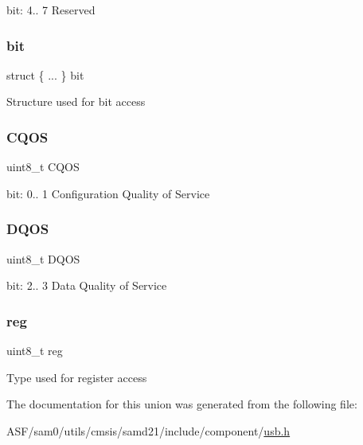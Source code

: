 bit\+: 4.. 7 Reserved \mbox{\label{union_u_s_b___q_o_s_c_t_r_l___type_a4f870df77aca85d5c6fe64a8fd95a56d}} 
\subsubsection{\texorpdfstring{bit}{bit}}
{\footnotesize\ttfamily struct \{ ... \}   bit}

Structure used for bit access \mbox{\label{union_u_s_b___q_o_s_c_t_r_l___type_a03cba86417c68f71d54469cf30dc94e4}} 
\subsubsection{\texorpdfstring{CQOS}{CQOS}}
{\footnotesize\ttfamily uint8\+\_\+t C\+Q\+OS}

bit\+: 0.. 1 Configuration Quality of Service \mbox{\label{union_u_s_b___q_o_s_c_t_r_l___type_adcbd494146bcd1226ac183aba7367698}} 
\subsubsection{\texorpdfstring{DQOS}{DQOS}}
{\footnotesize\ttfamily uint8\+\_\+t D\+Q\+OS}

bit\+: 2.. 3 Data Quality of Service \mbox{\label{union_u_s_b___q_o_s_c_t_r_l___type_a9428adc9af4653a2050e2536b55dec8d}} 
\subsubsection{\texorpdfstring{reg}{reg}}
{\footnotesize\ttfamily uint8\+\_\+t reg}

Type used for register access 

The documentation for this union was generated from the following file\+:\begin{DoxyCompactItemize}
\item 
A\+S\+F/sam0/utils/cmsis/samd21/include/component/\mbox{\hyperlink{component_2usb_8h}{usb.\+h}}\end{DoxyCompactItemize}

